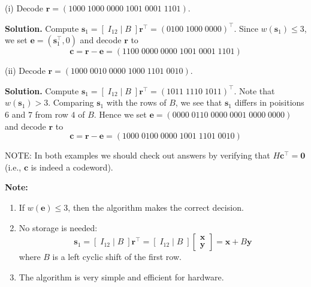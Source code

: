 \begin{exbox}
    \begin{example}
        $ \; $

        (i) Decode $ \bm{r}=(1000\; 1000\; 0000\; 1001\; 0001\; 1101) $.

        \textbf{Solution.} Compute $ \bm{s}_1=\left[ \; I_{12}\mid B \; \right]\bm{r}^\top=
        (0100\; 1000\; 0000)^\top $. Since $ w(\bm{s}_1)\leqslant 3 $, we set
        $ \bm{e}=(\bm{s}_1^\top,0) $ and decode $ \bm{r} $ to
        \[ \bm{c}=\bm{r}-\bm{e}=(1100\; 0000\; 0000\; 1001\; 0001\; 1101) \]

        (ii) Decode $ \bm{r}=(1000\; 0010\; 0000\; 1000\; 1101\; 0010) $.

        \textbf{Solution.} Compute $ \bm{s}_1=\left[ \; I_{12}\mid B \; \right]\bm{r}^\top=
        (1011\; 1110\; 1011)^\top $. Note that $ w(\bm{s}_1)>3 $. Comparing $ \bm{s}_1 $
        with the rows of $ B $, we see that $ \bm{s}_1 $ differs in poisitions $ 6 $
        and $ 7 $ from row $ 4 $ of $ B $. Hence we set $ \bm{e}=(0000\; 0110\; 0000\; 0001\; 0000\; 0000) $
        and decode $ \bm{r} $ to
        \[ \bm{c}=\bm{r}-\bm{e}=(1000\; 0100\; 0000\; 1001\; 1101\; 0010) \]
        
        NOTE: In both examples we should check out answers by verifying that $ H\bm{c}^\top=\bm{0} $
        (i.e., $ \bm{c} $ is indeed a codeword).
    \end{example}
\end{exbox}

\textbf{Note:}
\begin{enumerate}[(1)]
    \item If $ w(\bm{e})\leqslant 3 $, then the algorithm makes the correct decision.
    \item No storage is needed:
          \[ \bm{s}_1=\left[ \; I_{12}\mid B\; \right]\bm{r}^\top=\left[ \; I_{12}\mid B\; \right]
              \begin{bmatrix}
                  \bm{x} \\
                  \bm{y}
              \end{bmatrix}=\bm{x}+B\bm{y} \]
          where $ B $ is a left cyclic shift of the first row.
    \item The algorithm is very simple and efficient for hardware.
\end{enumerate}

